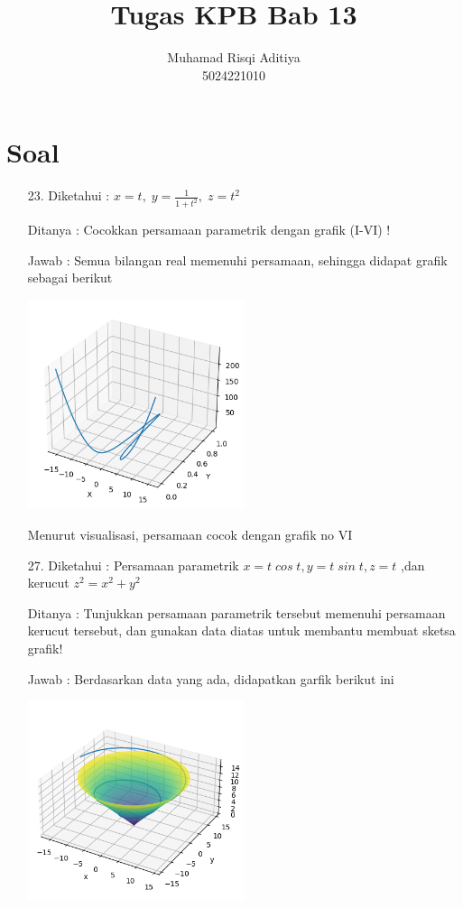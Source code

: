 \documentclass[twoside]{scrarticle}
\begin{document}
	\title{Tugas KPB Bab 13}
	\author{Muhamad Risqi Aditiya \protect\\ 5024221010}
	
	\maketitle
	
	\section*{Soal}
	\begin{enumerate}
		\item[23. ]
		Diketahui : $x = t,\;y = \frac{1}{1 + t^2},\;z = t^2$
		
		Ditanya : Cocokkan persamaan parametrik dengan grafik (I-VI) !
		
		Jawab : Semua bilangan real memenuhi persamaan, sehingga didapat grafik sebagai berikut
		
		\begin{minipage}{\linewidth}
			\includegraphics[width=0.5\textwidth]{image2.png}
			\centering
		\end{minipage}
		
		Menurut visualisasi, persamaan cocok dengan grafik no VI
		
		\item[27.] Diketahui : Persamaan parametrik $x =
		t\;cos\;t,y=t\;sin\;t, z=t$ ,dan kerucut $z^2 = x^2 + y^2$
		
		Ditanya : Tunjukkan persamaan parametrik tersebut memenuhi persamaan kerucut tersebut, dan gunakan data diatas untuk membantu membuat sketsa grafik!
		
		Jawab : Berdasarkan data yang ada, didapatkan garfik berikut ini
		
		\begin{minipage}{\linewidth}
			\includegraphics[width=0.5\textwidth]{27.png}
			\centering
		\end{minipage}
		

\end{enumerate}
\end{document}
